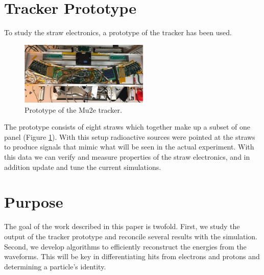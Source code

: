 \section{Tracker Prototype}
To study the straw electronics, a prototype of the tracker has been used.
\begin{figure}[htp!]
    \centering
    \includegraphics[width=0.55\textwidth]{Images2/prototype.png}
    \caption{Prototype of the Mu2e tracker.}
    \label{prototype}
\end{figure} 
The prototype consists of eight straws which together make up a subset of one panel (Figure \ref{prototype}). With this setup radioactive sources were pointed at the straws to produce signals that mimic what will be seen in the actual experiment. With this data we can verify and measure properties of the straw electronics, and in addition update and tune the current simulations.


\section{Purpose}
The goal of the work described in this paper is twofold. First, we study the output of the tracker prototype and reconcile several results with the simulation. Second, we develop algorithms to efficiently reconstruct the energies from the waveforms. This will be key in differentiating hits from electrons and protons and determining a particle's identity.


